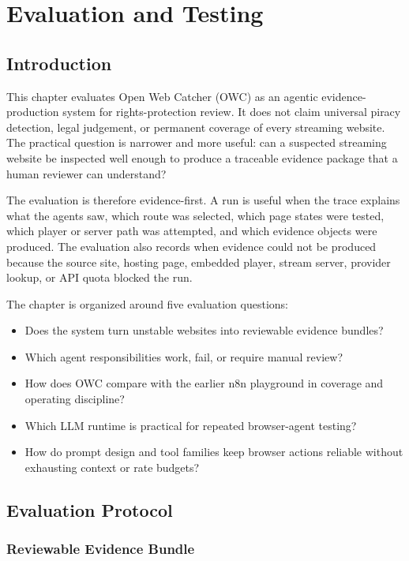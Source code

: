\chapter{Evaluation and Testing}

\section{Introduction}

This chapter evaluates Open Web Catcher (OWC) as an agentic evidence-production
system for rights-protection review. It does not claim universal piracy detection,
legal judgement, or permanent coverage of every streaming website. The practical
question is narrower and more useful: can a suspected streaming website be inspected
well enough to produce a traceable evidence package that a human reviewer can
understand?

The evaluation is therefore evidence-first. A run is useful when the trace explains
what the agents saw, which route was selected, which page states were tested, which
player or server path was attempted, and which evidence objects were produced. The
evaluation also records when evidence could not be produced because the source site,
hosting page, embedded player, stream server, provider lookup, or API quota blocked the
run.

The chapter is organized around five evaluation questions:
\begin{itemize}
  \item Does the system turn unstable websites into reviewable evidence bundles?
  \item Which agent responsibilities work, fail, or require manual review?
  \item How does OWC compare with the earlier n8n playground in coverage and
  operating discipline?
  \item Which LLM runtime is practical for repeated browser-agent testing?
  \item How do prompt design and tool families keep browser actions reliable without
  exhausting context or rate budgets?
\end{itemize}

\section{Evaluation Protocol}

\subsection{Reviewable Evidence Bundle}

